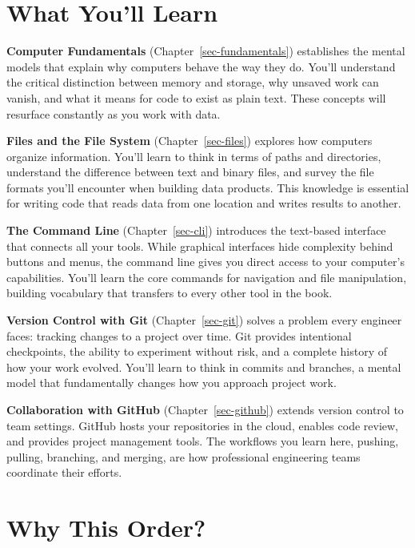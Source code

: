\documentclass[
  letterpaper,
  DIV=11,
  numbers=noendperiod]{scrreprt}
\begin{document}
\section*{What You'll Learn}\label{what-youll-learn}


\textbf{Computer Fundamentals} (Chapter~\ref{sec-fundamentals})
establishes the mental models that explain why computers behave the way
they do. You'll understand the critical distinction between memory and
storage, why unsaved work can vanish, and what it means for code to
exist as plain text. These concepts will resurface constantly as you
work with data.

\textbf{Files and the File System} (Chapter~\ref{sec-files}) explores
how computers organize information. You'll learn to think in terms of
paths and directories, understand the difference between text and binary
files, and survey the file formats you'll encounter when building data
products. This knowledge is essential for writing code that reads data
from one location and writes results to another.

\textbf{The Command Line} (Chapter~\ref{sec-cli}) introduces the
text-based interface that connects all your tools. While graphical
interfaces hide complexity behind buttons and menus, the command line
gives you direct access to your computer's capabilities. You'll learn
the core commands for navigation and file manipulation, building
vocabulary that transfers to every other tool in the book.

\textbf{Version Control with Git} (Chapter~\ref{sec-git}) solves a
problem every engineer faces: tracking changes to a project over time.
Git provides intentional checkpoints, the ability to experiment without
risk, and a complete history of how your work evolved. You'll learn to
think in commits and branches, a mental model that fundamentally changes
how you approach project work.

\textbf{Collaboration with GitHub} (Chapter~\ref{sec-github}) extends
version control to team settings. GitHub hosts your repositories in the
cloud, enables code review, and provides project management tools. The
workflows you learn here, pushing, pulling, branching, and merging, are
how professional engineering teams coordinate their efforts.

\section*{Why This Order?}\label{why-this-order}
\end{document}
